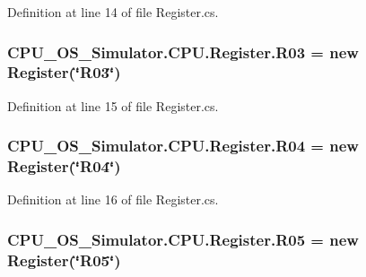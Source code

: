 Definition at line 14 of file Register.\+cs.

\hypertarget{class_c_p_u___o_s___simulator_1_1_c_p_u_1_1_register_a442530be904ccb54d0224eb441bccb27}{}
\subsubsection[{R03}]{ C\+P\+U\+\_\+\+O\+S\+\_\+\+Simulator.\+C\+P\+U.\+Register.\+R03 = new {\bf Register}(\char`\"{}R03\char`\"{})\hspace{0.3cm}{\ttfamily [static]}}\label{class_c_p_u___o_s___simulator_1_1_c_p_u_1_1_register_a442530be904ccb54d0224eb441bccb27}


Definition at line 15 of file Register.\+cs.

\hypertarget{class_c_p_u___o_s___simulator_1_1_c_p_u_1_1_register_aa86ab37f2ba652b534b8a6d4d338603e}{}
\subsubsection[{R04}]{ C\+P\+U\+\_\+\+O\+S\+\_\+\+Simulator.\+C\+P\+U.\+Register.\+R04 = new {\bf Register}(\char`\"{}R04\char`\"{})\hspace{0.3cm}{\ttfamily [static]}}\label{class_c_p_u___o_s___simulator_1_1_c_p_u_1_1_register_aa86ab37f2ba652b534b8a6d4d338603e}


Definition at line 16 of file Register.\+cs.

\hypertarget{class_c_p_u___o_s___simulator_1_1_c_p_u_1_1_register_a68c78defdae216e7110a284464e1ec64}{}
\subsubsection[{R05}]{ C\+P\+U\+\_\+\+O\+S\+\_\+\+Simulator.\+C\+P\+U.\+Register.\+R05 = new {\bf Register}(\char`\"{}R05\char`\"{})\hspace{0.3cm}{\ttfamily [static]}}\label{class_c_p_u___o_s___simulator_1_1_c_p_u_1_1_register_a68c78defdae216e7110a284464e1ec64}


